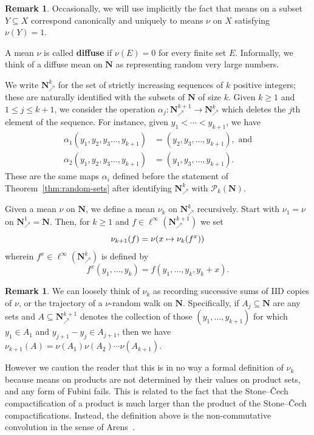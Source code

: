 \documentclass[12pt, pdflatex]{amsart}
\theoremstyle{definition}
\newtheorem{remark}[theorem]{Remark}
\numberwithin{equation}{section}
\numberwithin{theorem}{section}
\newcommand{\NN}{\mathbf{N}}
\newcommand{\sP}{\mathscr{P}}
\newcommand{\incr}{\NN_\nearrow}
\begin{document}
\begin{remark}\label{rem:subset}
Occasionally, we will use implicitly the fact that means on a subset $Y\subseteq X$ correspond canonically and uniquely to means $\nu$ on $X$ satisfying $\nu(Y)=1$.
\end{remark}

A mean $\nu$ is called \textbf{diffuse} if $\nu(E)=0$ for every finite set $E$. Informally, we think of a diffuse mean on $\NN$ as representing random very large numbers.

\bigskip

We write $\incr^k$ for the set of strictly increasing sequences of $k$ positive integers; these are naturally identified with the subsets of $\NN$ of size $k$. Given $k\geq 1$ and $1\leq j \leq k+1$, we consider the operation $\alpha_j\colon \incr^{k+1} \to \incr^{k}$ which deletes the $j$th element of the sequence. For instance, given $y_1 < \cdots  < y_{k+1}$, we have 
\begin{align*}
\alpha_1(y_1, y_2,y_3 \ldots , y_{k+1}) &= (y_2,y_3,  \ldots , y_{k+1}), \text{ and}\\
\alpha_2(y_1, y_2,y_3 \ldots , y_{k+1}) &= (y_1,y_3,  \ldots , y_{k+1}).
\end{align*}
These are the same maps $\alpha_i$ defined before the statement of Theorem~\ref{thm:random-sets} after identifying $\incr^k$ with $\sP_k(\NN)$.

Given a mean $\nu$ on $\NN$, we define a mean $\nu_k$ on  $\incr^k$ recursively. Start with $\nu_1 = \nu$ on $\incr^1 = \NN$. Then, for $k\geq 1$ and $f\in \ell^\infty(\incr^{k+1})$ we set
\begin{equation*}
\nu_{k+1}(f) = \nu \mleft( x \mapsto \nu_{k} \mleft( f^x \mright) \mright)
\end{equation*}
wherein $f^x \in \ell^\infty(\incr^{k})$ is defined by
\begin{equation*}
f^x (y_1, \ldots , y_{k}) = f (y_1, \ldots , y_{k},  y_{k}+x).
\end{equation*}
%
\begin{remark}\label{rem:RW}
We can loosely think of $\nu_k$ as recording successive sums of IID copies of $\nu$, or the trajectory of a $\nu$-random walk on $\NN$. Specifically, if $A_j\subseteq \NN$ are any sets and $A\subseteq \incr^{k+1}$ denotes the collection of those $(y_1, \ldots, y_{k+1})$ for which $y_1\in A_1$ and $y_{j+1} - y_j \in A_{j+1}$, then we have $\nu_{k+1}(A) = \nu(A_1) \nu(A_2) \cdots \nu(A_{k+1})$.

However we caution the reader that this is in no way a formal definition of $\nu_k$ because means on products are not determined by their values on product sets, and any form of Fubini fails. This is related to the fact that the  Stone--\v{C}ech compactification of a product is much larger than the product of the  Stone--\v{C}ech compactifications. Instead, the definition above is the non-commutative convolution in the sense of Arens~\cite{Arens51}.
\end{remark}
\end{document}
